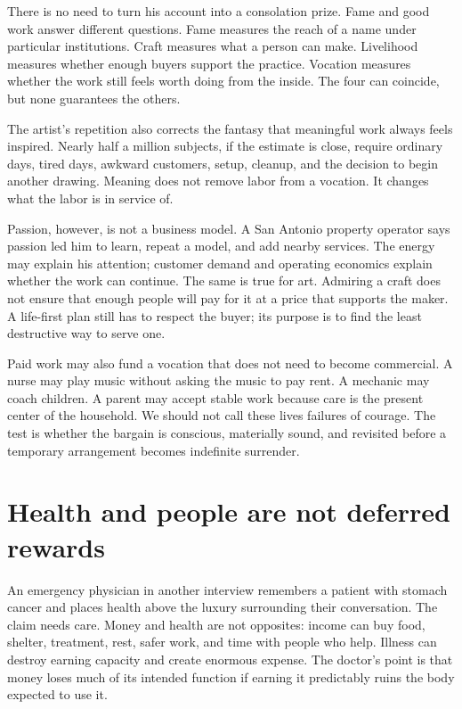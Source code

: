 There is no need to turn his account into a consolation prize. Fame and good
work answer different questions. Fame measures the reach of a name under
particular institutions. Craft measures what a person can make. Livelihood
measures whether enough buyers support the practice. Vocation measures whether
the work still feels worth doing from the inside. The four can coincide, but
none guarantees the others.

The artist's repetition also corrects the fantasy that meaningful work always
feels inspired. Nearly half a million subjects, if the estimate is close, require
ordinary days, tired days, awkward customers, setup, cleanup, and the decision
to begin another drawing. Meaning does not remove labor from a vocation. It
changes what the labor is in service of.

Passion, however, is not a business model. A San Antonio property operator says
passion led him to learn, repeat a model, and add nearby services. The energy
may explain his attention; customer demand and operating economics explain
whether the work can continue. The same is true for art. Admiring a craft does
not ensure that enough people will pay for it at a price that supports the
maker. A life-first plan still has to respect the buyer; its purpose is to find
the least destructive way to serve one.

Paid work may also fund a vocation that does not need to become commercial. A
nurse may play music without asking the music to pay rent. A mechanic may coach
children. A parent may accept stable work because care is the present center of
the household. We should not call these lives failures of courage. The test is
whether the bargain is conscious, materially sound, and revisited before a
temporary arrangement becomes indefinite surrender.

\section{Health and people are not deferred rewards}

An emergency physician in another interview remembers a patient with stomach
cancer and places health above the luxury surrounding their conversation. The
claim needs care. Money and health are not opposites: income can buy food,
shelter, treatment, rest, safer work, and time with people who help. Illness can
destroy earning capacity and create enormous expense. The doctor's point is
that money loses much of its intended function if earning it predictably ruins
the body expected to use it.

